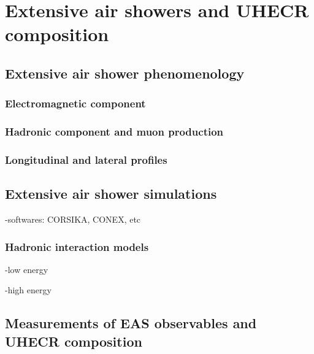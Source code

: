 \chapter[Extensive air showers and UHECR composition]{Extensive air showers and UHECR composition}
\label{sec:showers}


\section{Extensive air shower phenomenology}
\label{sec:showers:phen}

\subsection{Electromagnetic component}
\label{sec:showers:phen:em}

\subsection{Hadronic component and muon production}
\label{sec:showers:phen:had}

\subsection{Longitudinal and lateral profiles}
\label{sec:showers:phen:prof}


\section{Extensive air shower simulations}


-softwares: CORSIKA, CONEX, etc

\subsection{Hadronic interaction models}

-low energy

-high energy

\section{Measurements of EAS observables and UHECR composition}

